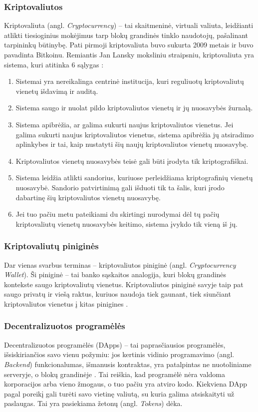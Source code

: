 \documentclass{VUMIFPSkursinis}
\begin{document}
\subsubsection{Kriptovaliutos}
Kriptovaliuta (angl. \textit{Cryptocurrency}) – tai skaitmeninė, virtuali valiuta, leidžianti atlikti tiesioginius mokėjimus tarp blokų grandinės tinklo naudotojų, pašalinant tarpininkų būtinybę. Pati pirmoji kriptovaliuta buvo sukurta 2009 metais ir buvo pavadinta Bitkoinu. Remiantis Jan Lansky moksliniu straipsniu, kriptovaliuta yra sistema, kuri atitinka 6 sąlygas \cite{lansky2018possible}:
\begin{enumerate}
    \item Sistemai yra nereikalinga centrinė institucija, kuri reguliuotų kriptovaliutų vienetų išdavimą ir auditą.
    \item Sistema saugo ir nuolat pildo kriptovaliutos vienetų ir jų nuosavybės žurnalą. 
    \item Sistema apibrėžia, ar galima sukurti naujus kriptovaliutos vienetus. Jei galima sukurti naujus kriptovaliutos vienetus, sistema apibrėžia jų atsiradimo aplinkybes ir tai, kaip nustatyti šių naujų kriptovaliutos vienetų nuosavybę.
    \item Kriptovaliutos vienetų nuosavybės teisė gali būti įrodyta tik kriptografiškai.
    \item Sistema leidžia atlikti sandorius, kuriuose perleidžiama kriptografinių vienetų nuosavybė. Sandorio patvirtinimą gali išduoti tik ta šalis, kuri įrodo dabartinę šių kriptovaliutos vienetų nuosavybę.
    \item Jei tuo pačiu metu pateikiami du skirtingi nurodymai dėl tų pačių kriptovaliutų vienetų nuosavybės keitimo, sistema įvykdo tik vieną iš jų.
\end{enumerate}

\subsubsection{Kriptovaliutų piniginės}
Dar vienas svarbus terminas – kriptovaliutos piniginė (angl. \textit{Cryptocurrency Wallet}). Ši piniginė – tai banko sąskaitos analogija, kuri blokų grandinės kontekste saugo kriptovaliutų vienetus. Kriptovaliutos piniginė savyje taip pat saugo privatų ir viešą raktus, kuriuos naudoja tiek gaunant, tiek siunčiant kriptovaliutos vienetus į kitas pinigines \cite{herbert2015novel}. 

\subsubsection{Decentralizuotos programėlės}
Decentralizuotos programėlės (DApps) – tai paprasčiausios programėlės, išsiskiriančios savo vienu požymiu: jos kertinis vidinio programavimo (angl. \textit{Backend}) funkcionalumas, išmanusis kontraktas, yra patalpintas ne nuotoliniame serveryje, o blokų grandinėje \cite{jiao2018auction}. Tai reiškia, kad programėlė nėra valdoma korporacijos arba vieno žmogaus, o tuo pačiu yra atviro kodo. Kiekviena DApp pagal poreikį gali turėti savo vietinę valiutą, su kuria galima atsiskaityti už paslaugas. Tai yra pasiekiama žetonų (angl. \textit{Tokens}) dėka.
\end{document}

